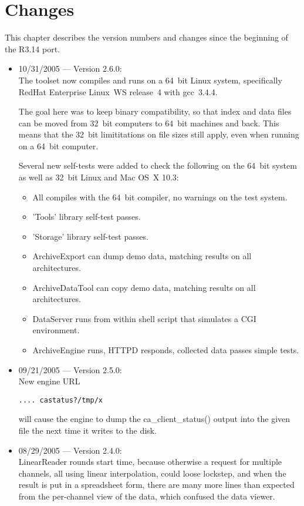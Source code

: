 \chapter{Changes}

This chapter describes the version numbers and changes since
the beginning of the R3.14 port.

\begin{itemize}

\item 10/31/2005 --- Version 2.6.0:\\
The toolset now compiles and runs on a 64~bit Linux system,
specifically RedHat Enterprise Linux~WS release~4
with gcc~3.4.4.

The goal here was to keep binary compatibility,
so that index and data files can be moved from
32~bit computers to 64~bit machines and back.
This means that the 32~bit limititations on
file sizes still apply, even when running
on a 64~bit computer.

Several new self-tests were added to check
the following on the 64~bit system as well
as 32~bit Linux and Mac OS~X 10.3:
\begin{itemize}
\item All compiles with the 64~bit compiler, no warnings on the test system.
\item 'Tools' library self-test passes.
\item 'Storage' library self-test passes.
\item ArchiveExport can dump demo data,
      matching results on all architectures.
\item ArchiveDataTool can copy demo data,
      matching results on all architectures.
\item DataServer runs from within shell script
      that simulates a CGI environment.
\item ArchiveEngine runs, HTTPD responds,
      collected data passes simple tests.
\end{itemize}

\item 09/21/2005 --- Version 2.5.0:\\
New engine URL
\begin{verbatim}
.... castatus?/tmp/x
\end{verbatim}
will cause the engine to dump the ca\_client\_status() output
into the given file the next time it writes to the disk.

\item 08/29/2005 --- Version 2.4.0:\\
LinearReader rounds start time,
because otherwise a request for multiple channels,
all using linear interpolation, could loose
lockstep, and when the result is put in a spreadsheet
form, there are many more lines than expected
from the per-channel view of the data,
which confused the data viewer.


\end{itemize}
